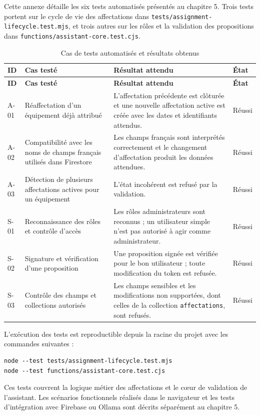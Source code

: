 \documentclass{rapportENSIAS}
\begin{document}
\noindent Cette annexe détaille les six tests automatisés présentés au chapitre 5. Trois tests portent sur le cycle de vie des affectations dans \texttt{tests/assignment-lifecycle.test.mjs}, et trois autres sur les rôles et la validation des propositions dans \texttt{functions/assistant-core.test.cjs}.

\begin{longtable}{|p{0.9cm}|p{4.6cm}|p{6.1cm}|p{1.7cm}|}
    \caption{Cas de tests automatisés et résultats obtenus}
    \label{tab:annexe-tests-detail}\\
    \hline
    \textbf{ID} & \textbf{Cas testé} & \textbf{Résultat attendu} & \textbf{État} \\
    \hline
    \endfirsthead
    \hline
    \textbf{ID} & \textbf{Cas testé} & \textbf{Résultat attendu} & \textbf{État} \\
    \hline
    \endhead
    A-01 & Réaffectation d’un équipement déjà attribué & L’affectation précédente est clôturée et une nouvelle affectation active est créée avec les dates et identifiants attendus. & Réussi \\
    \hline
    A-02 & Compatibilité avec les noms de champs français utilisés dans Firestore & Les champs français sont interprétés correctement et le changement d’affectation produit les données attendues. & Réussi \\
    \hline
    A-03 & Détection de plusieurs affectations actives pour un équipement & L’état incohérent est refusé par la validation. & Réussi \\
    \hline
    S-01 & Reconnaissance des rôles et contrôle d’accès & Les rôles administrateurs sont reconnus ; un utilisateur simple n’est pas autorisé à agir comme administrateur. & Réussi \\
    \hline
    S-02 & Signature et vérification d’une proposition & Une proposition signée est vérifiée pour le bon utilisateur ; toute modification du token est refusée. & Réussi \\
    \hline
    S-03 & Contrôle des champs et collections autorisés & Les champs sensibles et les modifications non supportées, dont celles de la collection \texttt{affectations}, sont refusés. & Réussi \\
    \hline
\end{longtable}

\noindent L’exécution des tests est reproductible depuis la racine du projet avec les commandes suivantes :

\begin{verbatim}
node --test tests/assignment-lifecycle.test.mjs
node --test functions/assistant-core.test.cjs
\end{verbatim}

\noindent Ces tests couvrent la logique métier des affectations et le cœur de validation de l’assistant. Les scénarios fonctionnels réalisés dans le navigateur et les tests d’intégration avec Firebase ou Ollama sont décrits séparément au chapitre 5.
\end{document}
